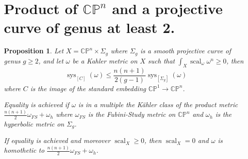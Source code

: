 \documentclass{amsart}
\newtheorem{proposition}[theorem]{Proposition}
\numberwithin{equation}{section}
\theoremstyle{definition}
\DeclareMathOperator{\scal}{scal}
\DeclareMathOperator{\sys}{sys}
\begin{document}
\section{Product of $\mathbb{CP}^n$ and a projective curve of genus at least 2.}

\begin{proposition}
    Let $X=\mathbb{CP}^n\times \Sigma_g$ where $\Sigma_g$ is a smooth projective curve of genus $g\geq 2$, and let $\omega$ be a Kahler metric on $X$ such that $\int_X\scal_\omega\omega^n\geq 0$, then \[\sys_{[C]}(\omega)\leq \frac{n(n+1)}{2(g-1)}\sys_{[\Sigma_g]}(\omega)\] where $C$ is the image of the standard embedding $\mathbb{CP}^1\to\mathbb{CP}^n$.

    Equality is achieved if $\omega$ is in a multiple the K\"ahler class of the product metric $\frac{n(n+1)}{2}\omega_{FS}+\omega_h$ where $\omega_{FS}$ is the Fubini-Study metric on $\mathbb{CP}^n$ and $\omega_h$ is the hyperbolic metric on $\Sigma_g$.

    If equality is achieved and moreover $\scal_X\geq 0$, then $\scal_X=0$ and $\omega$ is homothetic to $\frac{n(n+1)}{2}\omega_{FS}+\omega_h$.
\end{proposition}
\end{document}
